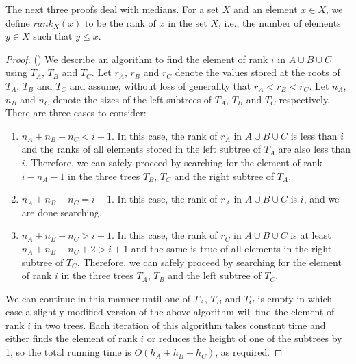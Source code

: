\documentclass{njcarticle}
\newcommand{\rank}{\mathord{rank}}
\begin{document}
The next three proofs deal with medians.   For a set $X$ and an
element $x\in X$, we define $\rank_X(x)$ to be the rank of $x$ in the
set $X$, i.e., the number of elements $y\in X$ such that $y\le x$.

\begin{proof}() 
We describe an algorithm to find the element of rank $i$ in $A\cup
B\cup C$ using $T_A$, $T_B$ and $T_C$.  Let $r_A$, $r_B$ and $r_C$ denote
the values stored at the roots of $T_A$, $T_B$ and $T_C$ and assume,
without loss of generality that $r_A< r_B< r_C$.  Let $n_A$, $n_B$ and
$n_C$ denote the sizes of the left subtrees of $T_A$, $T_B$ and $T_C$
respectively. There are three cases to consider:

\begin{enumerate}

\item $n_A + n_B + n_C < i-1$.  In this case, the rank of $r_A$ in
$A\cup B\cup C$ is less than $i$ and the ranks of all elements stored
in the left subtree of $T_A$ are also less than $i$.  Therefore, we
can safely proceed by searching for the element of rank $i-n_A-1$ in
the three trees $T_B$, $T_C$ and the right subtree of $T_A$.

\item $n_A + n_B + n_C = i-1$.  In this case, the rank of $r_A$ in
$A\cup B\cup C$ is $i$, and we are done searching.

\item $n_A + n_B + n_C > i-1$.  In this case, the rank of $r_C$ in
$A\cup B\cup C$ is at least $n_A + n_B + n_C + 2 > i+1$ and the same
is true of all elements in the right subtree of $T_C$.   Therefore, we
can safely proceed by searching for the element of rank $i$ in the
three trees $T_A$, $T_B$ and the left subtree of $T_C$.

\end{enumerate}

We can continue in this manner until one of $T_A$, $T_B$ and $T_C$ is
empty in which case a slightly modified version of the above algorithm
will find the element of rank $i$ in two trees.  Each iteration of
this algorithm takes constant time and either finds the element of
rank $i$ or reduces the height of one of the subtrees by 1, so the
total running time is $O(h_A+h_B+h_C)$, as required.  
\end{proof}
\end{document}
